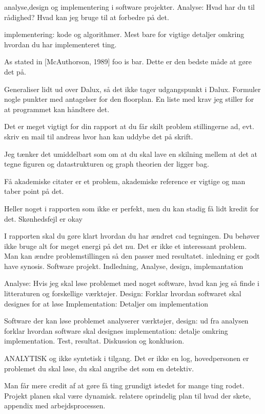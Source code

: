 analyse,design og implementering i software projekter.
Analyse: Hvad har du til rådighed?
Hvad kan jeg bruge til at forbedre på det.

implementering: kode og algorithmer. Mest bare for vigtige detaljer omkring hvordan du har implementeret ting.

As stated in [McAuthorson, 1989] foo is bar. Dette er den bedste måde at gøre det på.


Generaliser lidt ud over Dalux, så det ikke tager udgangspunkt i Dalux.
Formuler nogle punkter med antagelser for den floorplan. 
En liste med krav jeg stiller for at programmet kan håndtere det.


Det er meget vigtigt for din rapport at du får skilt problem stillingerne ad, evt. skriv en mail til andreas hvor han kan uddybe det på skrift.

Jeg tænker det umiddelbart som om at du skal lave en skilning mellem at det at tegne figuren og datastrukturen og graph theorien der ligger bag. 


Få akademiske citater er et problem, akademiske reference er vigtige og man taber point på det.

Heller noget i rapporten som ikke er perfekt, men du kan stadig få lidt kredit for det. Skønhedsfejl er okay

I rapporten skal du gøre klart hvordan du har ændret cad tegningen. Du behøver ikke bruge alt for meget energi på det nu. Det er ikke et interessant problem.
Man kan ændre problemstillingen så den passer med resultatet.
inledning er godt have synosis.
Software projekt. Indledning,  Analyse,  design, implemantation

Analyse: Hvis jeg skal løse problemet med noget software, hvad kan jeg så finde i litteraturen og forskellige værktøjer.
Design: Forklar hvordan softwaret skal designes for at løse 
Implementation: Detaljer om implementation

Software der kan løse problemet analyserer værktøjer, 
design: ud fra analysen forklar hvordan software skal designes 
implementation: detalje omkring implementation.
Test, resultat. Diskussion og konklusion.

ANALYTISK og ikke syntetisk i tilgang.
Det er ikke en log, hovedpersonen er problemet du skal løse, du skal angribe det som en detektiv. 

Man får mere credit af at gøre få ting grundigt istedet for mange ting rodet. 
Projekt planen skal være dynamisk.
relatere oprindelig plan til hvad der skete, appendix med arbejdsprocessen.


